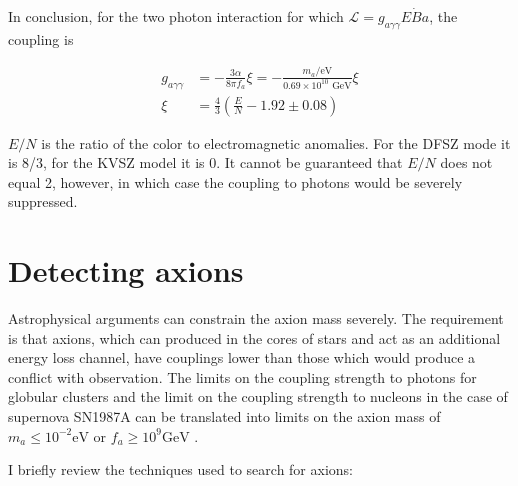 \documentclass[12pt,twosides]{book}
\begin{document}
In conclusion, for the two photon interaction for which $\mathcal{L} = g_{a\gamma\gamma}E\dot B a$, the coupling is

\begin{align*}
g_{a\gamma\gamma} &= -\frac{3\alpha}{8\pi f_a}\xi = - \frac{m_a/\text{eV}}{0.69\times10^{10}\text{ GeV}}\xi 
\\ \xi &= \frac{4}{3}(\frac{E}{N} - 1.92 \pm 0.08)
\end{align*}

$E/N$ is the ratio of the color to electromagnetic anomalies. For the DFSZ mode it is 8/3, for the KVSZ model it is 0. It cannot be guaranteed that $E/N$ does not equal 2, however, in which case the coupling to photons would be severely suppressed.


\section{Detecting axions}

Astrophysical arguments can constrain the axion mass severely. The requirement is that axions, which can produced in the cores of stars and act as an additional energy loss channel, have couplings lower than those which would produce a conflict with observation. The limits on the coupling strength to photons for globular clusters and the limit on the coupling strength to nucleons in the case of supernova SN1987A can be translated into limits on the axion mass of $m_a \leq 10^{-2} \text{eV}$ or $f_a \geq 10^9\text{GeV}$ \cite{raffelt08}.

I briefly review the techniques used to search for axions:
\end{document}
